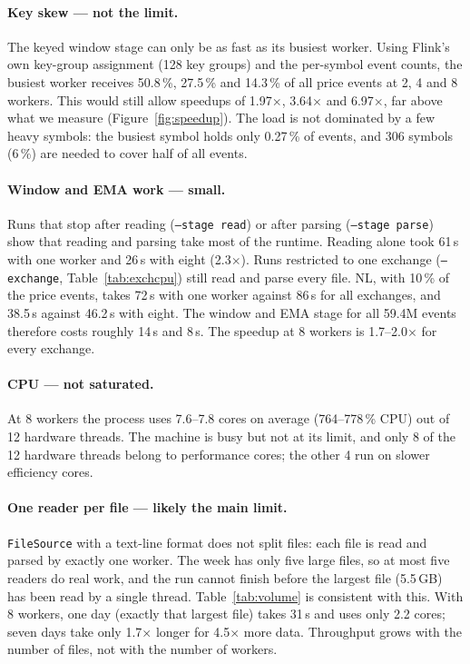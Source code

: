 \documentclass[sigconf,nonacm]{acmart}
\begin{document}
\paragraph{Key skew --- not the limit.} The keyed window stage can only be as
fast as its busiest worker. Using Flink's own key-group assignment (128 key
groups) and the per-symbol event counts, the busiest worker receives 50.8\,\%,
27.5\,\% and 14.3\,\% of all price events at 2, 4 and 8 workers. This would
still allow speedups of 1.97$\times$, 3.64$\times$ and 6.97$\times$, far above
what we measure (Figure~\ref{fig:speedup}). The load is not dominated by a few
heavy symbols: the busiest symbol holds only 0.27\,\% of events, and 306
symbols (6\,\%) are needed to cover half of all events.

\paragraph{Window and EMA work --- small.} Runs that stop after reading
(\texttt{--stage read}) or after parsing (\texttt{--stage parse}) show that
reading and parsing take most of the runtime. Reading alone took 61\,s with one
worker and 26\,s with eight (2.3$\times$). Runs restricted to one exchange
(\texttt{--exchange}, Table~\ref{tab:exchcpu}) still read and parse every file.
NL, with 10\,\% of the price events, takes 72\,s with one worker against 86\,s
for all exchanges, and 38.5\,s against 46.2\,s with eight. The window and EMA
stage for all 59.4M events therefore costs roughly 14\,s and 8\,s. The speedup at
8 workers is 1.7--2.0$\times$ for every exchange.

\paragraph{CPU --- not saturated.} At 8 workers the process uses 7.6--7.8 cores
on average (764--778\,\% CPU) out of 12 hardware threads. The machine is busy
but not at its limit, and only 8 of the 12 hardware threads belong to performance
cores; the other 4 run on slower efficiency cores.

\paragraph{One reader per file --- likely the main limit.} \texttt{FileSource} with a
text-line format does not split files: each file is read and parsed by exactly
one worker. The week has only five large files, so at most five readers do real
work, and the run cannot finish before the largest file (5.5\,GB) has been read
by a single thread. Table~\ref{tab:volume} is consistent with this. With 8 workers, one
day (exactly that largest file) takes 31\,s and uses only 2.2 cores; seven days
take only 1.7$\times$ longer for 4.5$\times$ more data. Throughput grows with the
number of files, not with the number of workers.
\end{document}
